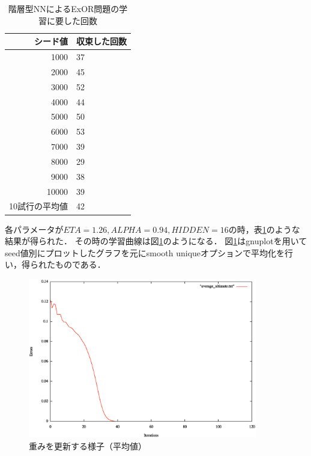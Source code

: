 \begin{table}[htb]
 \begin{center}
  \begin{tabular}[htb]{|r|l|} \hline
   シード値 & 収束した回数 \\ \hline \hline
   1000     & 37\\ \hline
   2000     & 45\\ \hline
   3000     & 52\\ \hline
   4000     & 44\\ \hline
   5000     & 50\\ \hline
   6000     & 53\\ \hline
   7000     & 39\\ \hline
   8000     & 29\\ \hline
   9000     & 38\\ \hline
   10000    & 39 \\ \hline \hline
   10試行の平均値 & 42 \\ \hline
  \end{tabular}
  \caption{階層型NNによるExOR問題の学習に要した回数}
  \label{table:level2}
 \end{center}
\end{table}

各パラメータが$ETA=1.26, ALPHA=0.94, HIDDEN=16$の時，表\ref{table:level2}のような結果が得られた．
その時の学習曲線は図\ref{fig:averageultimate}のようになる．
図\ref{fig:averageultimate}はgnuplotを用いてseed値別にプロットしたグラフを元にsmooth uniqueオプションで平均化を行い，得られたものである．

\begin{figure}[h]
 \begin{center}
  \includegraphics[width=10.0cm]{./level2figs/averageultimate.eps}
  \caption{重みを更新する様子（平均値）}
  \label{fig:averageultimate}
 \end{center}
\end{figure}


